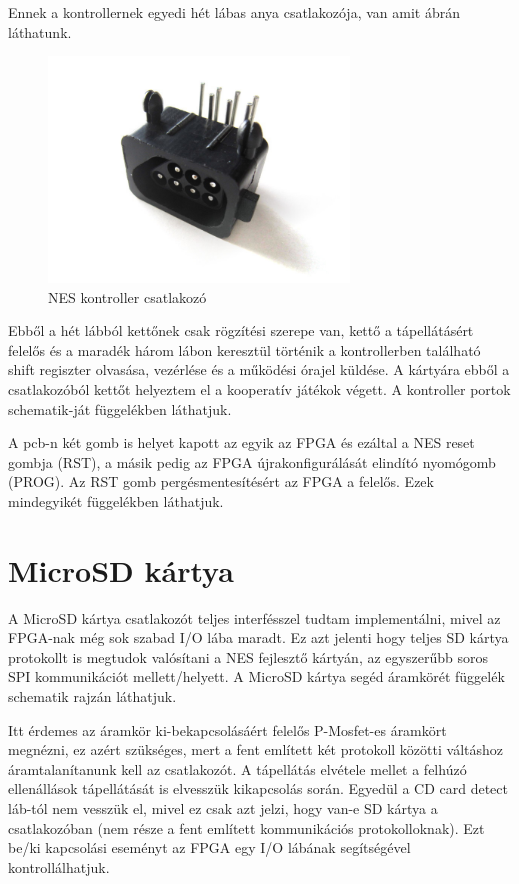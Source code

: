 	Ennek a kontrollernek egyedi hét lábas anya csatlakozója, van amit  ábrán láthatunk.   
	
	\begin{figure}[H]
		\centering
		\includegraphics[width=80mm, keepaspectratio]{figures/7pin-connector} %
		\caption{NES kontroller csatlakozó}
		\label{fig:7PIN-Port}
	\end{figure}
	
	Ebből a hét lábból kettőnek csak rögzítési szerepe van, kettő a tápellátásért felelős és a maradék három lábon keresztül történik a kontrollerben található shift regiszter  olvasása, vezérlése és a működési órajel küldése. A kártyára ebből a csatlakozóból kettőt helyeztem el a kooperatív játékok végett. A kontroller portok schematik-ját  függelékben láthatjuk.
	
	A pcb-n két gomb is helyet kapott az egyik az FPGA és ezáltal a NES reset gombja (RST), a másik pedig az FPGA újrakonfigurálását elindító nyomógomb (PROG). Az RST gomb pergésmentesítésért az FPGA a felelős. Ezek mindegyikét  függelékben láthatjuk. 
	
\section{MicroSD kártya}
	
	A MicroSD kártya csatlakozót teljes interfésszel tudtam implementálni, mivel az FPGA-nak még sok szabad I/O lába maradt. Ez azt jelenti hogy teljes SD kártya protokollt is megtudok valósítani a NES fejlesztő kártyán, az egyszerűbb soros SPI kommunikációt mellett/helyett. A MicroSD kártya segéd áramkörét  függelék schematik rajzán láthatjuk. 
	
	Itt érdemes az áramkör ki-bekapcsolásáért felelős P-Mosfet-es áramkört megnézni, ez azért szükséges, mert a fent említett két protokoll közötti váltáshoz áramtalanítanunk kell az csatlakozót. A tápellátás elvétele mellet a felhúzó ellenállások tápellátását is elvesszük kikapcsolás során. Egyedül a CD card detect láb-tól nem vesszük el, mivel ez csak azt jelzi, hogy van-e SD kártya a csatlakozóban (nem része a fent említett kommunikációs protokolloknak). Ezt be/ki kapcsolási eseményt az FPGA egy I/O lábának segítségével kontrollálhatjuk.
	
